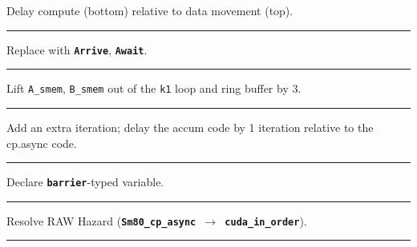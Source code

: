 {\LARGE
Delay compute (bottom) relative to data movement (top).
}

\newpage
{}

{\large

}

\vspace{3mm}
\hrule

{\LARGE
Replace with \textbf{\texttt{Arrive}}, \textbf{\texttt{Await}}.
}

\newpage
{}

{\large

}

\vspace{3mm}
\hrule

{\LARGE

Lift \texttt{A\_smem}, \texttt{B\_smem} out of the \texttt{k1} loop and ring buffer by 3.

}

\newpage
{}

{\large

}

\vspace{3mm}
\hrule

{\LARGE

Add an extra  iteration; delay the accum code by 1 iteration relative to the cp.async code.

}

\newpage
{}

{\large

}

\vspace{3mm}
\hrule

{\LARGE
Declare \textbf{\texttt{barrier}}-typed variable.

}

\newpage
{}

{\large

}

\vspace{3mm}
\hrule

{\LARGE
Resolve RAW Hazard (\textbf{\texttt{Sm80\_cp\_async $\to$ cuda\_in\_order}}).

}

\newpage
{}

{\large

}

\vspace{3mm}
\hrule

